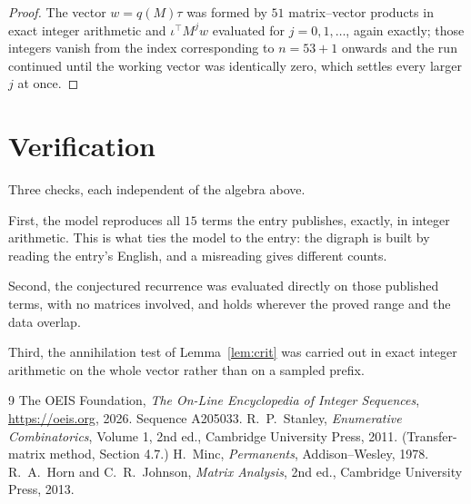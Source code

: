 \documentclass[11pt,a4paper]{article}
\theoremstyle{plain}
\theoremstyle{definition}
\begin{document}
\begin{proof}
The vector $w=q(M)\tau$ was formed by $51$ matrix--vector products in exact integer
arithmetic and $\iota^{\!\top}M^{j}w$ evaluated for $j=0,1,\dots$, again exactly; those
integers vanish from the index corresponding to $n=53+1$ onwards and the run continued
until the working vector was identically zero, which settles every larger $j$ at once.
\end{proof}

\section{Verification}

Three checks, each independent of the algebra above.

First, the model reproduces all $15$ terms the entry publishes, exactly, in integer
arithmetic. This is what ties the model to the entry: the digraph is built by reading the
entry's English, and a misreading gives different counts.

Second, the conjectured recurrence was evaluated directly on those published terms, with no
matrices involved, and holds wherever the proved range and the data overlap.

Third, the annihilation test of Lemma~\ref{lem:crit} was carried out in exact integer
arithmetic on the whole vector rather than on a sampled prefix.

\begin{thebibliography}{9}
 The OEIS Foundation, \emph{The On-Line Encyclopedia of Integer
Sequences}, \url{https://oeis.org}, 2026. Sequence A205033.
 R.~P.~Stanley, \emph{Enumerative Combinatorics}, Volume 1, 2nd ed.,
Cambridge University Press, 2011. (Transfer-matrix method, Section 4.7.)
 H.~Minc, \emph{Permanents}, Addison--Wesley, 1978.
 R.~A.~Horn and C.~R.~Johnson, \emph{Matrix Analysis}, 2nd ed., Cambridge
University Press, 2013.
\end{thebibliography}
\end{document}
